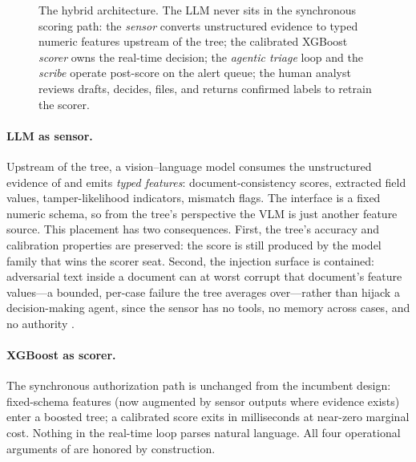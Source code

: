 \begin{figure}[t]
{%
}
\caption{The hybrid architecture. The LLM never sits in the synchronous scoring
path: the \emph{sensor} converts unstructured evidence to typed numeric
features upstream of the tree; the calibrated XGBoost \emph{scorer} owns the
real-time decision; the \emph{agentic triage} loop and the \emph{scribe}
operate post-score on the alert queue; the human analyst reviews drafts,
decides, files, and returns confirmed labels to retrain the scorer.}
\label{fig:p8-architecture}
\end{figure}

\paragraph{LLM as sensor.} Upstream of the tree, a vision--language model
consumes the unstructured evidence of  and emits
\emph{typed features}: document-consistency scores, extracted field values,
tamper-likelihood indicators, mismatch flags. The interface is a fixed numeric
schema, so from the tree's perspective the VLM is just another feature source.
This placement has two consequences. First, the tree's accuracy and
calibration properties are preserved: the score is still produced by the model
family that wins the scorer seat. Second, the injection surface is contained:
adversarial text inside a document can at worst corrupt that document's
feature values---a bounded, per-case failure the tree averages over---rather
than hijack a decision-making agent, since the sensor has no tools, no memory
across cases, and no authority \citep{greshake2023injection}.

\paragraph{XGBoost as scorer.} The synchronous authorization path is unchanged
from the incumbent design: fixed-schema features (now augmented by sensor
outputs where evidence exists) enter a boosted tree; a calibrated score exits
in milliseconds at near-zero marginal cost. Nothing in the real-time loop
parses natural language. All four operational arguments of
 are honored by construction.


